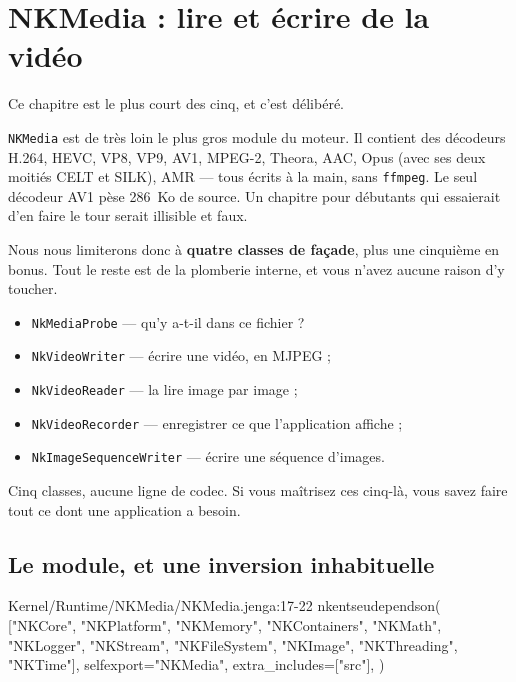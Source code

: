 \chapter{NKMedia : lire et écrire de la vidéo}

Ce chapitre est le plus court des cinq, et c'est délibéré.

\texttt{NKMedia} est de très loin le plus gros module du moteur. Il contient des
décodeurs H.264, HEVC, VP8, VP9, AV1, MPEG-2, Theora, AAC, Opus (avec ses deux
moitiés CELT et SILK), AMR — tous écrits à la main, sans \texttt{ffmpeg}. Le
seul décodeur AV1 pèse 286~Ko de source. Un chapitre pour débutants qui
essaierait d'en faire le tour serait illisible et faux.

Nous nous limiterons donc à \textbf{quatre classes de façade}, plus une
cinquième en bonus. Tout le reste est de la plomberie interne, et vous n'avez
aucune raison d'y toucher.

\begin{nkretenir}
\begin{itemize}
  \item \texttt{NkMediaProbe} — qu'y a-t-il dans ce fichier ?
  \item \texttt{NkVideoWriter} — écrire une vidéo, en MJPEG ;
  \item \texttt{NkVideoReader} — la lire image par image ;
  \item \texttt{NkVideoRecorder} — enregistrer ce que l'application affiche ;
  \item \texttt{NkImageSequenceWriter} — écrire une séquence d'images.
\end{itemize}
Cinq classes, aucune ligne de codec. Si vous maîtrisez ces cinq-là, vous savez
faire tout ce dont une application a besoin.
\end{nkretenir}

\section{Le module, et une inversion inhabituelle}

\begin{nkcode}{Kernel/Runtime/NKMedia/NKMedia.jenga:17-22}
    nkentseudependson(
        ["NKCore", "NKPlatform", "NKMemory", "NKContainers", "NKMath", "NKLogger",
         "NKStream", "NKFileSystem", "NKImage", "NKThreading", "NKTime"],
        selfexport="NKMedia",
        extra_includes=["src"],
    )
\end{nkcode}

